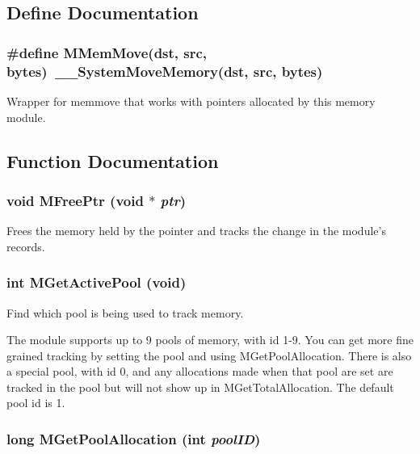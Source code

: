 \subsection{Define Documentation}
\subsubsection{\setlength{\rightskip}{0pt plus 5cm}\#define MMem\-Move(dst, src, bytes)\ \_\-\_\-System\-Move\-Memory(dst, src, bytes)}\label{memory_8h_a7}


Wrapper for memmove that works with pointers allocated by this memory module. 



\subsection{Function Documentation}
\subsubsection{\setlength{\rightskip}{0pt plus 5cm}void MFree\-Ptr (void $\ast$ {\em ptr})}\label{memory_8h_a9}


Frees the memory held by the pointer and tracks the change in the module's records. 

\subsubsection{\setlength{\rightskip}{0pt plus 5cm}int MGet\-Active\-Pool (void)}\label{memory_8h_a21}


Find which pool is being used to track memory. 

The module supports up to 9 pools of memory, with id 1-9. You can get more fine grained tracking by setting the pool and using MGet\-Pool\-Allocation. There is also a special pool, with id 0, and any allocations made when that pool are set are tracked in the pool but will not show up in MGet\-Total\-Allocation. The default pool id is 1. 
\subsubsection{\setlength{\rightskip}{0pt plus 5cm}long MGet\-Pool\-Allocation (int {\em pool\-ID})}\label{memory_8h_a22}


